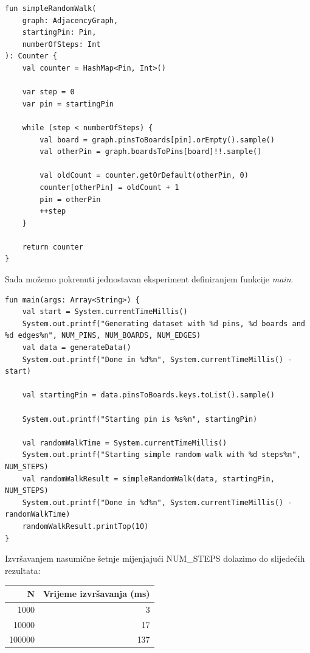 \documentclass[times, utf8, seminar]{fer}
\begin{document}
\begin{lstlisting}
fun simpleRandomWalk(
	graph: AdjacencyGraph,
	startingPin: Pin,
	numberOfSteps: Int
): Counter {
    val counter = HashMap<Pin, Int>()

    var step = 0
    var pin = startingPin

    while (step < numberOfSteps) {
        val board = graph.pinsToBoards[pin].orEmpty().sample()
        val otherPin = graph.boardsToPins[board]!!.sample()

        val oldCount = counter.getOrDefault(otherPin, 0)
        counter[otherPin] = oldCount + 1
        pin = otherPin
        ++step
    }

    return counter
}
\end{lstlisting}

Sada možemo pokrenuti jednostavan eksperiment definiranjem funkcije \textit{main}.

\begin{lstlisting}
fun main(args: Array<String>) {
    val start = System.currentTimeMillis()
    System.out.printf("Generating dataset with %d pins, %d boards and %d edges%n", NUM_PINS, NUM_BOARDS, NUM_EDGES)
    val data = generateData()
    System.out.printf("Done in %d%n", System.currentTimeMillis() - start)

    val startingPin = data.pinsToBoards.keys.toList().sample()

    System.out.printf("Starting pin is %s%n", startingPin)

    val randomWalkTime = System.currentTimeMillis()
    System.out.printf("Starting simple random walk with %d steps%n", NUM_STEPS)
    val randomWalkResult = simpleRandomWalk(data, startingPin, NUM_STEPS)
    System.out.printf("Done in %d%n", System.currentTimeMillis() - randomWalkTime)
    randomWalkResult.printTop(10)
}
\end{lstlisting}

Izvršavanjem nasumične šetnje mijenjajući NUM\_STEPS dolazimo do slijedećih rezultata:

\begin{center}
		  \begin{tabular}{ |r|r| }
					 \hline
					 N & Vrijeme izvršavanja (ms) \\
					 \hline
					 1000 & 3 \\
					 \hline
					 10000 & 17 \\
					 \hline
					 100000 & 137 \\
					 \hline
		  \end{tabular}
\end{center}
\end{document}
